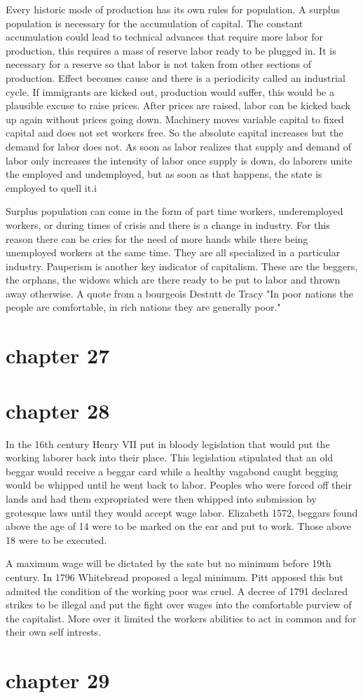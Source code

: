 \documentclass{article}
\begin{document}
Every historic mode of production has its own rules for population. A surplus population is necessary for the accumulation of capital. The constant accumulation could lead to technical advances that require more labor for production, this requires a mass of reserve labor ready to be plugged in. It is necessary for a reserve so that labor is not taken from other sections of production. Effect becomes cause and there is a periodicity called an industrial cycle. If immigrants are kicked out, production would suffer, this would be a plausible excuse to raise prices. After prices are raised, labor can be kicked back up again without prices going down. Machinery moves variable capital to fixed capital and does not set workers free. So the absolute capital increases but the demand for labor does not. As soon as labor realizes that supply and demand of labor only increases the intensity of labor once supply is down, do laborers unite the employed and undemployed, but as soon as that happens, the state is employed to quell it.i

Surplus population can come in the form of part time workers, underemployed workers, or during times of crisis and there is a change in industry. For this reason there can be cries for the need of more hands while there being unemployed workers at the same time. They are all specialized in a particular industry. Pauperism is another key indicator of capitalism. These are the beggers, the orphans, the widows which are there ready to be put to labor and thrown away otherwise. A quote from a bourgeois Destutt de Tracy "In poor nations the people are comfortable, in rich nations they are generally poor."

\section{chapter 27}

\section{chapter 28}
In the 16th century Henry VII put in bloody legislation that would put the working laborer back into their place. This legislation stipulated that an old beggar would receive a beggar card while a healthy vagabond caught begging would be whipped until he went back to labor. Peoples who were forced off their lands and had them expropriated were then whipped into submission by grotesque laws until they would accept wage labor. Elizabeth 1572, beggars found above the age of 14 were to be marked on the ear and put to work. Those above 18 were to be executed. 

A maximum wage will be dictated by the sate but no minimum before 19th century. In 1796 Whitebread proposed a legal minimum. Pitt apposed this but admited the condition of the working poor was cruel. A decree of 1791 declared strikes to be illegal and put the fight over wages into the comfortable purview of the capitalist. More over it limited the workers abilities to act in common and for their own self intrests. 

\section{chapter 29}
\end{document}
